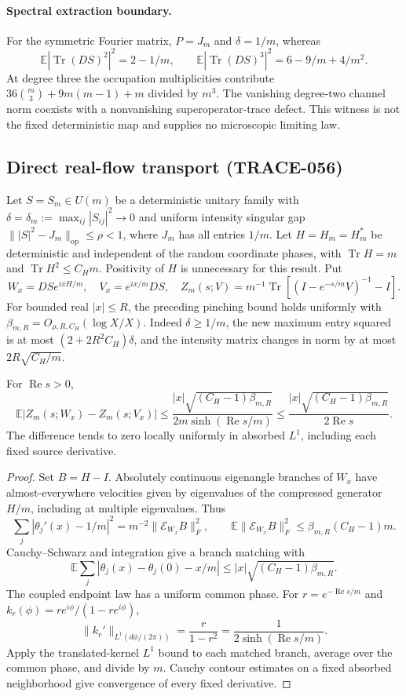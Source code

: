 \paragraph{Spectral extraction boundary.}
For the symmetric Fourier matrix, $P=J_m$ and $\delta=1/m$, whereas
\[
 \mathbb E|\operatorname{Tr}(DS)^2|^2=2-1/m,
 \qquad
 \mathbb E|\operatorname{Tr}(DS)^3|^2=6-9/m+4/m^2.
\]
At degree three the occupation multiplicities contribute
$36\binom m3+9m(m-1)+m$ divided by $m^3$.
The vanishing degree-two channel norm coexists with a nonvanishing
superoperator-trace defect. This witness is not the fixed deterministic map
and supplies no microscopic limiting law.

\subsection{Direct real-flow transport (TRACE-056)}
Let $S=S_m\in U(m)$ be a deterministic unitary family with
$\delta=\delta_m:=\max_{ij}|S_{ij}|^2\to0$ and uniform intensity
singular gap $\||S|^2-J_m\|_{\mathrm{op}}\le\rho<1$, where
$J_m$ has all entries $1/m$. Let $H=H_m=H_m^*$ be deterministic
and independent of the random coordinate phases, with
$\operatorname{Tr}H=m$ and $\operatorname{Tr}H^2\le C_Hm$.
Positivity of $H$ is unnecessary for this result. Put
\[
 W_x=DS e^{ixH/m},\quad V_x=e^{ix/m}DS,\quad
 Z_m(s;V)=m^{-1}\operatorname{Tr}[(I-e^{-s/m}V)^{-1}-I].
\]
For bounded real $|x|\le R$, the preceding pinching bound holds uniformly
with $\beta_{m,R}=O_{\rho,R,C_H}(\log X/X)$. Indeed
$\delta\ge1/m$, the new maximum entry squared is at most
$(2+2R^2C_H)\delta$, and the intensity matrix changes in norm by at most
$2R\sqrt{C_H/m}$.
\begin{theorem}
For $\operatorname{Re}s>0$,
\[
 \mathbb E|Z_m(s;W_x)-Z_m(s;V_x)|
 \le\frac{|x|\sqrt{(C_H-1)\beta_{m,R}}}
 {2m\sinh(\operatorname{Re}s/m)}
 \le\frac{|x|\sqrt{(C_H-1)\beta_{m,R}}}{2\operatorname{Re}s}.
\]
The difference tends to zero locally uniformly in absorbed $L^1$,
including each fixed source derivative.
\end{theorem}
\begin{proof}
Set $B=H-I$. Absolutely continuous eigenangle branches of $W_x$ have
almost-everywhere velocities given by eigenvalues of the compressed
generator $H/m$, including at multiple eigenvalues. Thus
\[
 \sum_j|\theta_j'(x)-1/m|^2
 =m^{-2}\|\mathcal E_{W_x}B\|_F^2,
 \qquad
 \mathbb E\|\mathcal E_{W_x}B\|_F^2
 \le\beta_{m,R}(C_H-1)m.
\]
Cauchy--Schwarz and integration give a branch matching with
\[
 \mathbb E\sum_j|\theta_j(x)-\theta_j(0)-x/m|
 \le |x|\sqrt{(C_H-1)\beta_{m,R}}.
\]
The coupled endpoint law has a uniform common phase. For
$r=e^{-\operatorname{Re}s/m}$ and
$k_r(\phi)=re^{i\phi}/(1-re^{i\phi})$,
\[
 \|k_r'\|_{L^1(d\phi/(2\pi))}
 =\frac{r}{1-r^2}=\frac1{2\sinh(\operatorname{Re}s/m)}.
\]
Apply the translated-kernel $L^1$ bound to each matched branch, average
over the common phase, and divide by $m$. Cauchy contour estimates on a
fixed absorbed neighborhood give convergence of every fixed derivative.
\end{proof}
